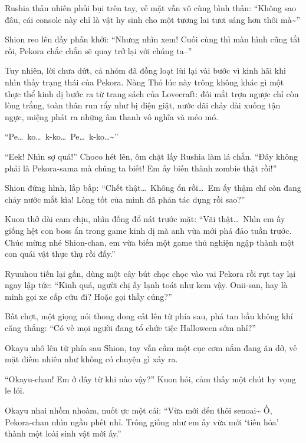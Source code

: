 \documentclass[../main.tex]{subfiles}
\begin{document}
Rushia thản nhiên phủi bụi trên tay, vẻ mặt vẫn vô cùng bình thản: ``Không sao đâu, cái console này chỉ là vật hy sinh cho một tương lai tươi sáng hơn thôi mà\~{}''

Shion reo lên đầy phấn khởi: ``Nhưng nhìn xem! Cuối cùng thì màn hình cũng tắt rồi, Pekora chắc chắn sẽ quay trở lại với chúng ta--''

Tuy nhiên, lời chưa dứt, cả nhóm đã đồng loạt lùi lại vài bước vì kinh hãi khi nhìn thấy trạng thái của Pekora. Nàng Thỏ lúc này trông không khác gì một thực thể kinh dị bước ra từ trang sách của Lovecraft: đôi mắt trợn ngược chỉ còn lòng trắng, toàn thân run rẩy như bị điện giật, nước dãi chảy dài xuống tận ngực, miệng phát ra những âm thanh vô nghĩa và méo mó.

``Pe\dots\ ko\dots\ k-ko\dots\ Pe\dots\ k-ko\dots\~{}''


``Eek! Nhìn sợ quá!'' Choco hét lên, ôm chặt lấy Rushia làm lá chắn. ``Đây không phải là Pekora-sama mà chúng ta biết! Em ấy biến thành zombie thật rồi!''

Shion đứng hình, lắp bắp: ``Chết thật\dots\ Không ổn rồi\dots\ Em ấy thậm chí còn đang chảy nước mắt kìa! Lòng tốt của mình đã phản tác dụng rồi sao?''

Kuon thở dài cam chịu, nhìn đống đổ nát trước mặt: ``Vãi thật\dots\ Nhìn em ấy giống hệt con boss ẩn trong game kinh dị mà anh vừa mới phá đảo tuần trước. Chúc mừng nhé Shion-chan, em vừa biến một game thủ nghiện ngập thành một con quái vật thực thụ rồi đấy.''

Ryuuhou tiến lại gần, dùng một cây bút chọc chọc vào vai Pekora rồi rụt tay lại ngay lập tức: ``Kinh quá, người chị ấy lạnh toát như kem vậy. Onii-san, hay là mình gọi xe cấp cứu đi? Hoặc gọi thầy cúng?''

Bất chợt, một giọng nói thong dong cất lên từ phía sau, phá tan bầu không khí căng thẳng: ``Có vẻ mọi người đang tổ chức tiệc Halloween sớm nhỉ?''

Okayu nhô lên từ phía sau Shion, tay vẫn cầm một cục cơm nắm đang ăn dở, vẻ mặt điềm nhiên như không có chuyện gì xảy ra.


``Okayu-chan! Em ở đây từ khi nào vậy?'' Kuon hỏi, cảm thấy một chút hy vọng le lói.

Okayu nhai nhồm nhoàm, nuốt ực một cái: ``Vừa mới đến thôi senoai\~{} Ồ, Pekora-chan nhìn ngầu phết nhỉ. Trông giống như em ấy vừa mới `tiến hóa' thành một loài sinh vật mới ấy.''
\end{document}
